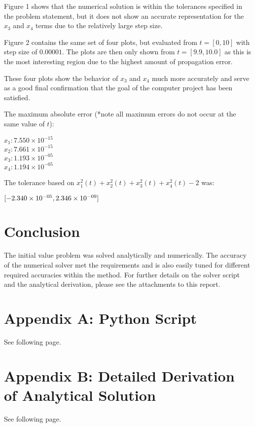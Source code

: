 \documentclass[11pt, oneside]{article}   	%
\begin{document}
Figure 1 shows that the numerical solution is within the tolerances specified in the problem statement, but it does not show an accurate representation for the $x_3$ and $x_4$ terms due to the relatively large step size.



Figure 2 contains the same set of four plots, but evaluated from $t = [0, 10]$ with step size of $0.00001$. The plots are then only shown from $t = [9.9, 10.0]$ as this is the most interesting region due to the highest amount of propagation error. 



These four plots show the behavior of $x_3$ and $x_4$ much more accurately and serve as a good final confirmation that the goal of the computer project has been satisfied.

The maximum absolute error (*note all maximum errors do not occur at the same value of $t$):

$x_1: 7.550\times10^{-15}$\\
$x_2: 7.661\times10^{-15}$\\
$x_3: 1.193\times10^{-05}$\\
$x_4: 1.194\times10^{-05}$

The tolerance based on $x^2_1(t) + x^2_2(t) + x^2_3(t) + x^2_4(t) - 2$ was: 

$[-2.340\times10^{-05}, \space \space 2.346\times10^{-09}]$

\section{Conclusion}
The initial value problem was solved analytically and numerically. The accuracy of the numerical solver met the requirements and is also easily tuned for different required accuracies within the method. For further details on the solver script and the analytical derivation, please see the attachments to this report.


\section{Appendix A: Python Script}
See following page.



\section{Appendix B:  Detailed Derivation of Analytical Solution}
See following page.


\end{document}
